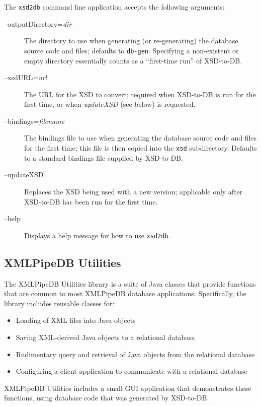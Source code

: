 \documentclass[11pt]{article}
\begin{document}
The \texttt{xsd2db} command line application accepts the following arguments:
\begin{description}
\item[--outputDirectory=\emph{dir}] The directory to use when generating (or re-generating) the database source code and files; defaults to \texttt{db-gen}.  Specifying a non-existent or empty directory essentially counts as a ``first-time run'' of XSD-to-DB.

\item[--xsdURL=\emph{url}] The URL for the XSD to convert; required when XSD-to-DB is run for the first time, or when \emph{updateXSD} (see below) is requested.

\item[--bindings=\emph{filename}] The bindings file to use when generating the database source code and files for the first time; this file is then copied into the \texttt{xsd} subdirectory.  Defaults to a standard bindings file supplied by XSD-to-DB.

\item[--updateXSD] Replaces the XSD being used with a new version; applicable only after XSD-to-DB has been run for the first time.

\item[--help] Displays a help message for how to use \texttt{xsd2db}.
\end{description}

\subsection{XMLPipeDB Utilities}

The XMLPipeDB Utilities library is a suite of Java classes that provide functions that are common to most XMLPipeDB database applications.  Specifically, the library includes reusable classes for:
\begin{itemize}
\item Loading of XML files into Java objects
\item Saving XML-derived Java objects to a relational database
\item Rudimentary query and retrieval of Java objects from the relational database
\item Configuring a client application to communicate with a relational database
\end{itemize}
XMLPipeDB Utilities includes a small GUI application that demonstrates these functions, using database code that was generated by XSD-to-DB.
\end{document}
